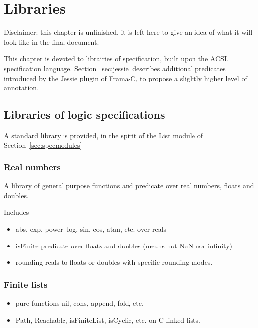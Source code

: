 \chapter{Libraries}
\label{chap:lib}

Disclaimer: this chapter is unfinished, it is left here to give
an idea of what it will look like in the final document.

This chapter is devoted to librairies of specification, built upon the
ACSL specification language.  Section~\ref{sec:jessie} describes
additional predicates introduced by the Jessie plugin of Frama-C, to
propose a slightly higher level of annotation.

\section{Libraries of logic specifications}
\label{sec:speclibraries}

A standard library is provided, in the spirit of the List module of
Section~\ref{sec:specmodules}


\subsection{Real numbers}
\label{sec:libreal}

A library of general purpose functions and predicate over real
numbers, floats and doubles.

Includes

\begin{itemize}
\item abs, exp, power, log, sin, cos, atan, etc. over reals

\item isFinite predicate over floats and doubles (means not NaN nor infinity)

\item rounding reals to floats or doubles with specific rounding modes.

\end{itemize}

\subsection{Finite lists}

\begin{itemize}
\item pure functions nil, cons, append, fold, etc.
\item Path, Reachable, isFiniteList, isCyclic, etc. on C linked-lists.
\end{itemize}


